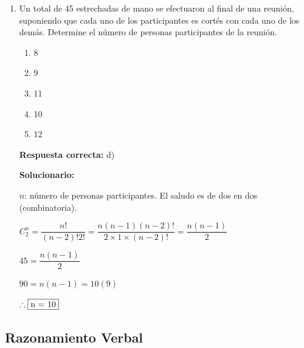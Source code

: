 \begin{enumerate}[resume]
	\vspace{6mm}



	\item Un total de 45 estrechadas de mano se efectuaron al final de una reunión, suponiendo que cada uno de los participantes es cortés con cada uno de los demás. Determine el número de personas participantes de la reunión.
	\begin{enumerate}[label=\alph*)]
		\item 8
		\item 9
		\item 11
		\item 10
		\item 12
	\end{enumerate}
	\textbf{Respuesta correcta:} d)

	\vspace{2mm}
	\textbf{Solucionario:}

	$n$: número de personas participantes. El saludo es de dos en dos (combinatoria).

	$ C_{2}^{n} = \dfrac{n!}{(n-2)! 2!} = \dfrac{n(n-1)(n-2)!}{2 \times 1 \times (n-2)!} = \dfrac{n(n-1)}{2} $

	$ 45 = \dfrac{n(n-1)}{2} $

	$ 90 = n(n-1) = 10(9) $

	$\therefore  \fbox{n = 10}$

	\vspace{6mm}



\end{enumerate}









\subsection*{Razonamiento Verbal}

